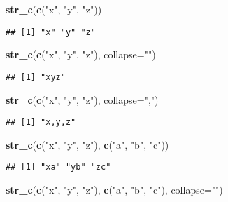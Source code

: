 \documentclass[
]{article}
\newenvironment{Shaded}{\begin{snugshade}}{\end{snugshade}}
\newcommand{\DataTypeTok}[1]{\textcolor[rgb]{0.13,0.29,0.53}{#1}}
\newcommand{\KeywordTok}[1]{\textcolor[rgb]{0.13,0.29,0.53}{\textbf{#1}}}
\newcommand{\NormalTok}[1]{#1}
\newcommand{\StringTok}[1]{\textcolor[rgb]{0.31,0.60,0.02}{#1}}
\begin{document}
\begin{Shaded}
\begin{Highlighting}[]
\KeywordTok{str\_c}\NormalTok{(}\KeywordTok{c}\NormalTok{(}\StringTok{"x"}\NormalTok{, }\StringTok{"y"}\NormalTok{, }\StringTok{"z"}\NormalTok{))}
\end{Highlighting}
\end{Shaded}

\begin{verbatim}
## [1] "x" "y" "z"
\end{verbatim}

\begin{Shaded}
\begin{Highlighting}[]
\KeywordTok{str\_c}\NormalTok{(}\KeywordTok{c}\NormalTok{(}\StringTok{"x"}\NormalTok{, }\StringTok{"y"}\NormalTok{, }\StringTok{"z"}\NormalTok{), }\DataTypeTok{collapse=}\StringTok{""}\NormalTok{)}
\end{Highlighting}
\end{Shaded}

\begin{verbatim}
## [1] "xyz"
\end{verbatim}

\begin{Shaded}
\begin{Highlighting}[]
\KeywordTok{str\_c}\NormalTok{(}\KeywordTok{c}\NormalTok{(}\StringTok{"x"}\NormalTok{, }\StringTok{"y"}\NormalTok{, }\StringTok{"z"}\NormalTok{), }\DataTypeTok{collapse=}\StringTok{","}\NormalTok{)}
\end{Highlighting}
\end{Shaded}

\begin{verbatim}
## [1] "x,y,z"
\end{verbatim}

\begin{Shaded}
\begin{Highlighting}[]
\KeywordTok{str\_c}\NormalTok{(}\KeywordTok{c}\NormalTok{(}\StringTok{"x"}\NormalTok{, }\StringTok{"y"}\NormalTok{, }\StringTok{"z"}\NormalTok{), }\KeywordTok{c}\NormalTok{(}\StringTok{"a"}\NormalTok{, }\StringTok{"b"}\NormalTok{, }\StringTok{"c"}\NormalTok{))}
\end{Highlighting}
\end{Shaded}

\begin{verbatim}
## [1] "xa" "yb" "zc"
\end{verbatim}

\begin{Shaded}
\begin{Highlighting}[]
\KeywordTok{str\_c}\NormalTok{(}\KeywordTok{c}\NormalTok{(}\StringTok{"x"}\NormalTok{, }\StringTok{"y"}\NormalTok{, }\StringTok{"z"}\NormalTok{), }\KeywordTok{c}\NormalTok{(}\StringTok{"a"}\NormalTok{, }\StringTok{"b"}\NormalTok{, }\StringTok{"c"}\NormalTok{), }\DataTypeTok{collapse=}\StringTok{""}\NormalTok{)}
\end{Highlighting}
\end{Shaded}
\end{document}
